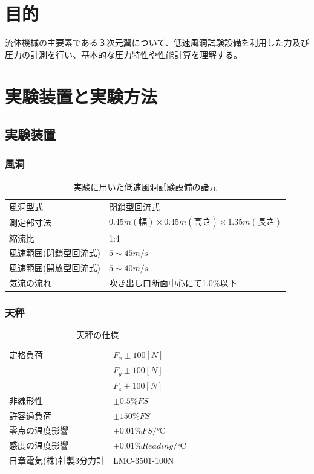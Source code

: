 \documentclass[a4j,twoside,openright,11pt]{jarticle}
\begin{document}
\section{目的}
流体機械の主要素である３次元翼について、低速風洞試験設備を利用した力及び圧力の計測を行い、基本的な圧力特性や性能計算を理解する。

\section{実験装置と実験方法}
\subsection{実験装置}
\subsubsection{風洞}

\begin{table}[htb]
\begin{center}
  \caption{実験に用いた低速風洞試験設備の諸元}
  \begin{tabular}{ll} \hline
風洞型式                &閉鎖型回流式\\
測定部寸法              &$0.45m(幅)\times 0.45m(高さ) \times 1.35m(長さ) $\\
縮流比                  &1:4\\
風速範囲(閉鎖型回流式)  &$5 \sim 45 m/s$\\
風速範囲(開放型回流式)  &$5 \sim 40 m/s$\\
気流の流れ              &吹き出し口断面中心にて1.0\%以下\\
\hline
  \end{tabular}
\end{center}
\end{table}

\subsubsection{天秤}

\begin{table}[htb]
\begin{center}
  \caption{天秤の仕様}
  \begin{tabular}{ll} \hline
定格負荷                &$F_x \pm 100[N]$\\
                        &$F_y \pm 100[N]$\\
                        &$F_z \pm 100[N]$\\
非線形性                &$\pm 0.5 \% FS$\\
許容過負荷              &$\pm 150 \% FS$\\
零点の温度影響          &$\pm 0.01 \% FS/℃ $\\
感度の温度影響          &$\pm 0.01 \% Reading/℃$\\
日章電気(株)社製3分力計 &LMC-3501-100N\\
\hline
  \end{tabular}
\end{center}
\end{table}
\end{document}
